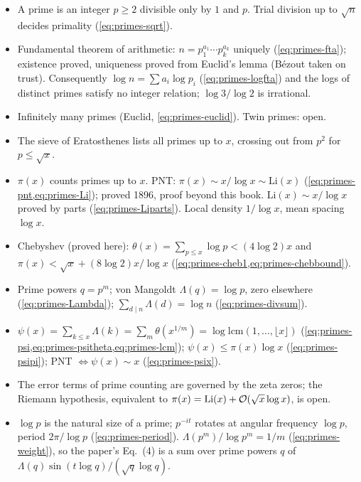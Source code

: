 \begin{itemize}
\item A prime is an integer $p\ge2$ divisible only by $1$ and $p$. Trial division up to $\sqrt n$ decides primality (\cref{eq:primes-sqrt}).
\item Fundamental theorem of arithmetic: $n=p_1^{a_1}\cdots p_k^{a_k}$ uniquely (\cref{eq:primes-fta}); existence proved, uniqueness proved from Euclid's lemma (B\'ezout taken on trust). Consequently $\log n=\sum a_i\log p_i$ (\cref{eq:primes-logfta}) and the logs of distinct primes satisfy no integer relation; $\log3/\log2$ is irrational.
\item Infinitely many primes (Euclid, \cref{eq:primes-euclid}). Twin primes: open.
\item The sieve of Eratosthenes lists all primes up to $x$, crossing out from $p^2$ for $p\le\sqrt x$.
\item $\pi(x)$ counts primes up to $x$. PNT: $\pi(x)\sim x/\log x\sim\mathrm{Li}(x)$ (\cref{eq:primes-pnt,eq:primes-Li}); proved 1896, proof beyond this book. $\mathrm{Li}(x)\sim x/\log x$ proved by parts (\cref{eq:primes-Liparts}). Local density $1/\log x$, mean spacing $\log x$.
\item Chebyshev (proved here): $\theta(x)=\sum_{p\le x}\log p<(4\log2)x$ and $\pi(x)<\sqrt x+(8\log2)x/\log x$ (\cref{eq:primes-cheb1,eq:primes-chebbound}).
\item Prime powers $q=p^m$; von Mangoldt $\Lambda(q)=\log p$, zero elsewhere (\cref{eq:primes-Lambda}); $\sum_{d\mid n}\Lambda(d)=\log n$ (\cref{eq:primes-divsum}).
\item $\psi(x)=\sum_{k\le x}\Lambda(k)=\sum_m\theta(x^{1/m})=\log\mathrm{lcm}(1,\dots,\lfloor x\rfloor)$ (\cref{eq:primes-psi,eq:primes-psitheta,eq:primes-lcm}); $\psi(x)\le\pi(x)\log x$ (\cref{eq:primes-psipi}); PNT $\Leftrightarrow\psi(x)\sim x$ (\cref{eq:primes-psix}).
\item The error terms of prime counting are governed by the zeta zeros; the Riemann hypothesis, equivalent to $\pi(x)=\mathrm{Li}(x)+\mathcal{O}(\sqrt x\log x)$, is open.
\item $\log p$ is the natural size of a prime; $p^{-it}$ rotates at angular frequency $\log p$, period $2\pi/\log p$ (\cref{eq:primes-period}). $\Lambda(p^m)/\log p^m=1/m$ (\cref{eq:primes-weight}), so the paper's Eq.~(4) is a sum over prime powers $q$ of $\Lambda(q)\sin(t\log q)/(\sqrt q\log q)$.
\end{itemize}


